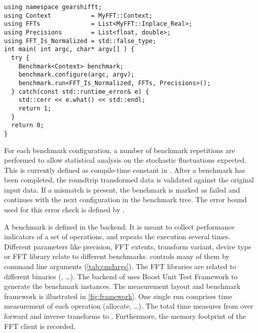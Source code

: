 \begin{lstlisting}[caption={Using FFT client types to run the benchmarks},label={lst:implfftusingp2}]
using namespace gearshifft;
using Context           = MyFFT::Context;         
using FFTs              = List<MyFFT::Inplace_Real>;
using Precisions        = List<float, double>;   
using FFT_Is_Normalized = std::false_type;
int main( int argc, char* argv[] ) {                                                        
  try {                                                  
    Benchmark<Context> benchmark;
    benchmark.configure(argc, argv);                     
    benchmark.run<FFT_Is_Normalized, FFTs, Precisions>();
  } catch(const std::runtime_error& e) {
    std::cerr << e.what() << std::endl;                  
    return 1;                                            
  }                                                      
  return 0;
}                                                        
\end{lstlisting}

For each benchmark configuration, a number of benchmark repetitions are performed to allow statistical analysis on the stochastic fluctuations expected. This is currently defined as compile-time constant in . After a benchmark has been completed, the roundtrip transformed data is validated against the original input data. If a mismatch is present, the benchmark is marked as failed and \gearshifft{} continues with the next configuration in the benchmark tree. The error bound used for this error check is defined by . 

A \gearshifft{} benchmark is defined in the backend. It is meant to collect performance indicators of a set of operations, and repeats the execution several times. Different parameters like precision, FFT extents, transform variant, device type or FFT library relate to different benchmarks.
\gearshifft{} controls many of them by command line arguments (\cref{tab:cmdargs}). The FFT libraries are related to different \gearshifft{} binaries (, \ldots).
The backend of \gearshifft{} uses Boost Unit Test Framework to generate the benchmark instances. %
%
The measurement layout and benchmark framework is illustrated in \cref{fig:framework}.
One single run comprises time measurement of each operation (allocate, \ldots). 
The total time measures from  over forward and inverse transforms to .
Furthermore, the memory footprint of the FFT client is recorded.

